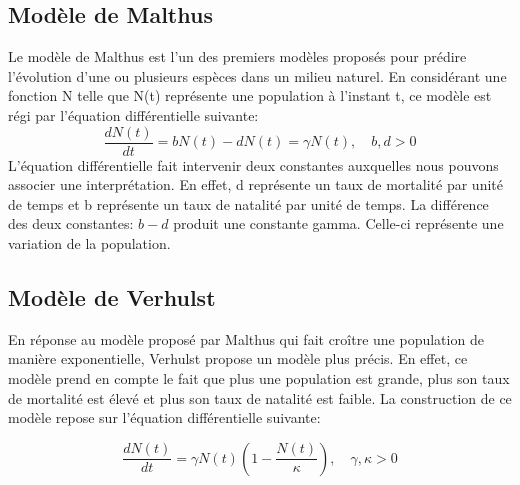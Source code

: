 \documentclass{article}
\begin{document}
\subsection{Modèle de Malthus}
Le modèle de Malthus est l'un des premiers modèles proposés pour prédire l'évolution d'une ou plusieurs espèces dans un milieu naturel. En considérant une fonction N telle que N(t) représente une population à l'instant t, ce modèle est régi par l'équation différentielle suivante:
\begin{equation}
    \frac{dN(t)}{dt} = bN(t)-dN(t) = \gamma N(t), \quad b,d > 0
\end{equation}
L'équation différentielle fait intervenir deux constantes auxquelles nous pouvons associer une interprétation. En effet, d représente un taux de mortalité par unité de temps et b représente un taux de natalité par unité de temps. La différence des deux constantes: $b-d$ produit une constante gamma. Celle-ci représente une variation de la population. 
\subsection{Modèle de Verhulst}
En réponse au modèle proposé par Malthus qui fait croître une population de manière exponentielle, Verhulst propose un modèle plus précis. En effet, ce modèle prend en compte le fait que plus une population est grande, plus son taux de mortalité est élevé et plus son taux de natalité est faible.
La construction de ce modèle repose sur l'équation différentielle suivante:

\begin{equation}
   \frac{dN(t)}{dt} = \displaystyle\gamma N(t)     \left( 1 - \frac{N(t)}{\kappa} \right),    \quad \gamma, \kappa > 0
\end{equation}
\end{document}
